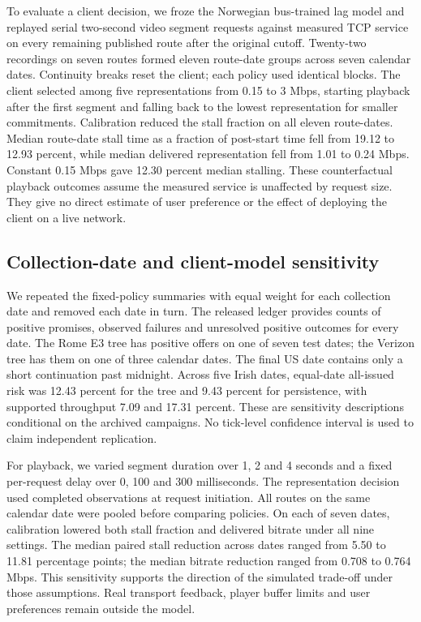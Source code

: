 \documentclass[journal,onecolumn,10pt]{IEEEtran}
\begin{document}
To evaluate a client decision, we froze the Norwegian bus-trained lag model and replayed serial two-second video segment requests against measured TCP service on every remaining published route after the original cutoff. Twenty-two recordings on seven routes formed eleven route-date groups across seven calendar dates. Continuity breaks reset the client; each policy used identical blocks. The client selected among five representations from 0.15 to 3 Mbps, starting playback after the first segment and falling back to the lowest representation for smaller commitments. Calibration reduced the stall fraction on all eleven route-dates. Median route-date stall time as a fraction of post-start time fell from 19.12 to 12.93 percent, while median delivered representation fell from 1.01 to 0.24 Mbps. Constant 0.15 Mbps gave 12.30 percent median stalling. These counterfactual playback outcomes assume the measured service is unaffected by request size. They give no direct estimate of user preference or the effect of deploying the client on a live network.

\subsection{Collection-date and client-model sensitivity}
We repeated the fixed-policy summaries with equal weight for each collection date and removed each date in turn. The released ledger provides counts of positive promises, observed failures and unresolved positive outcomes for every date. The Rome E3 tree has positive offers on one of seven test dates; the Verizon tree has them on one of three calendar dates. The final US date contains only a short continuation past midnight. Across five Irish dates, equal-date all-issued risk was 12.43 percent for the tree and 9.43 percent for persistence, with supported throughput 7.09 and 17.31 percent. These are sensitivity descriptions conditional on the archived campaigns. No tick-level confidence interval is used to claim independent replication.

For playback, we varied segment duration over 1, 2 and 4 seconds and a fixed per-request delay over 0, 100 and 300 milliseconds. The representation decision used completed observations at request initiation. All routes on the same calendar date were pooled before comparing policies. On each of seven dates, calibration lowered both stall fraction and delivered bitrate under all nine settings. The median paired stall reduction across dates ranged from 5.50 to 11.81 percentage points; the median bitrate reduction ranged from 0.708 to 0.764 Mbps. This sensitivity supports the direction of the simulated trade-off under those assumptions. Real transport feedback, player buffer limits and user preferences remain outside the model.
\end{document}
